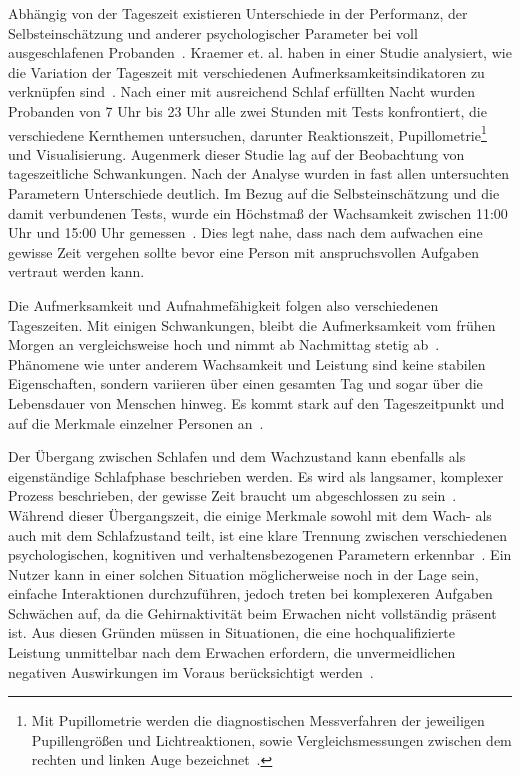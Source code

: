Abhängig von der Tageszeit existieren Unterschiede in der Performanz, der Selbsteinschätzung und anderer psychologischer Parameter bei voll ausgeschlafenen Probanden~\cite{kraemer2000time}.
Kraemer et. al. haben in einer Studie analysiert, wie die Variation der Tageszeit mit verschiedenen Aufmerksamkeitsindikatoren zu verknüpfen sind~\cite{kraemer2000time}. 
Nach einer mit ausreichend Schlaf erfüllten Nacht wurden Probanden von 7 Uhr bis 23 Uhr alle zwei Stunden mit Tests konfrontiert, die verschiedene Kernthemen untersuchen, darunter Reaktionszeit, Pupillometrie\footnote{Mit Pupillometrie werden die diagnostischen Messverfahren der jeweiligen Pupillengrößen und Lichtreaktionen, sowie Vergleichsmessungen zwischen dem rechten und linken Auge bezeichnet~\cite{sachsenweger1975neuroophthalmologie}.} und Visualisierung.
Augenmerk dieser Studie lag auf der Beobachtung von tageszeitliche Schwankungen. Nach der Analyse wurden in fast allen untersuchten Parametern Unterschiede deutlich. 
Im Bezug auf die Selbsteinschätzung und die damit verbundenen Tests, wurde ein Höchstmaß der Wachsamkeit zwischen 11:00 Uhr und 15:00 Uhr gemessen~\cite{kraemer2000time}. Dies legt nahe, dass nach dem aufwachen eine gewisse Zeit vergehen sollte bevor eine Person mit anspruchsvollen Aufgaben vertraut werden kann.

Die Aufmerksamkeit und Aufnahmefähigkeit folgen also verschiedenen Tageszeiten.
Mit einigen Schwankungen, bleibt die Aufmerksamkeit vom frühen Morgen an vergleichsweise hoch und nimmt ab Nachmittag stetig ab~\cite{kraemer2000time}.
Phänomene wie unter anderem Wachsamkeit und Leistung sind keine stabilen Eigenschaften, sondern variieren über einen gesamten Tag und sogar über die Lebensdauer von Menschen hinweg. 
Es kommt stark auf den Tageszeitpunkt und auf die Merkmale einzelner Personen an~\cite{kraemer2000time}.

Der Übergang zwischen Schlafen und dem Wachzustand kann ebenfalls als eigenständige Schlafphase beschrieben werden. Es wird als langsamer, komplexer Prozess beschrieben, der gewisse Zeit braucht um abgeschlossen zu sein~\cite{ferrara2000sleep}. 
Während dieser Übergangszeit, die einige Merkmale sowohl mit dem Wach- als auch mit dem Schlafzustand teilt, ist eine klare Trennung zwischen verschiedenen psychologischen, kognitiven und verhaltensbezogenen Parametern erkennbar~\cite{ferrara2000sleep}. 
Ein Nutzer kann in einer solchen Situation möglicherweise noch in der Lage sein, einfache Interaktionen durchzuführen, jedoch treten bei komplexeren Aufgaben Schwächen auf, da die Gehirnaktivität beim Erwachen nicht vollständig präsent ist. 
Aus diesen Gründen müssen in Situationen, die eine hochqualifizierte Leistung unmittelbar nach dem Erwachen erfordern, die unvermeidlichen negativen Auswirkungen im Voraus berücksichtigt werden~\cite{ferrara2000sleep}. 
